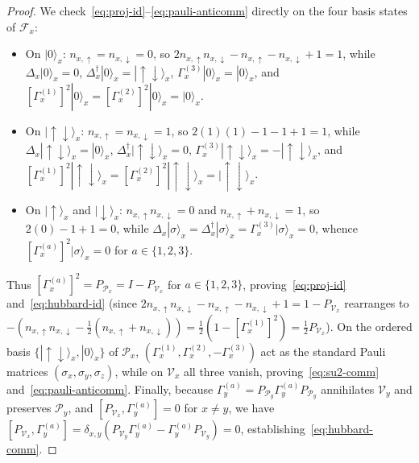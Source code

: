 \documentclass[11pt]{article}
\theoremstyle{definition}
\theoremstyle{remark}
\newcommand{\calF}{\mathcal{F}}
\newcommand{\calP}{\mathcal{P}}
\newcommand{\calV}{\mathcal{V}}
\begin{document}
\begin{proof}
We check~\eqref{eq:proj-id}--\eqref{eq:pauli-anticomm} directly on the four basis states of $\calF_x$:
\begin{itemize}[leftmargin=2em]
\item On $|0\rangle_x$: $n_{x,\uparrow} = n_{x,\downarrow} = 0$, so $2 n_{x,\uparrow}n_{x,\downarrow} - n_{x,\uparrow} - n_{x,\downarrow} + 1 = 1$, while $\Delta_x |0\rangle_x = 0$, $\Delta_x^\dagger |0\rangle_x = |\uparrow\downarrow\rangle_x$, $\Gamma_x^{(3)} |0\rangle_x = |0\rangle_x$, and $[\Gamma_x^{(1)}]^2 |0\rangle_x = [\Gamma_x^{(2)}]^2 |0\rangle_x = |0\rangle_x$.
\item On $|\uparrow\downarrow\rangle_x$: $n_{x,\uparrow} = n_{x,\downarrow} = 1$, so $2(1)(1) - 1 - 1 + 1 = 1$, while $\Delta_x |\uparrow\downarrow\rangle_x = |0\rangle_x$, $\Delta_x^\dagger |\uparrow\downarrow\rangle_x = 0$, $\Gamma_x^{(3)} |\uparrow\downarrow\rangle_x = -|\uparrow\downarrow\rangle_x$, and $[\Gamma_x^{(1)}]^2 |\uparrow\downarrow\rangle_x = [\Gamma_x^{(2)}]^2 |\uparrow\downarrow\rangle_x = |\uparrow\downarrow\rangle_x$.
\item On $|\uparrow\rangle_x$ and $|\downarrow\rangle_x$: $n_{x,\uparrow}n_{x,\downarrow} = 0$ and $n_{x,\uparrow} + n_{x,\downarrow} = 1$, so $2(0) - 1 + 1 = 0$, while $\Delta_x |\sigma\rangle_x = \Delta_x^\dagger |\sigma\rangle_x = \Gamma_x^{(3)} |\sigma\rangle_x = 0$, whence $[\Gamma_x^{(a)}]^2 |\sigma\rangle_x = 0$ for $a \in \{1,2,3\}$.
\end{itemize}
Thus $[\Gamma_x^{(a)}]^2 = P_{\calP_x} = I - P_{\calV_x}$ for $a \in \{1,2,3\}$, proving~\eqref{eq:proj-id} and~\eqref{eq:hubbard-id} (since $2n_{x,\uparrow}n_{x,\downarrow} - n_{x,\uparrow} - n_{x,\downarrow} + 1 = 1 - P_{\calV_x}$ rearranges to $-(n_{x,\uparrow}n_{x,\downarrow} - \frac{1}{2}(n_{x,\uparrow}+n_{x,\downarrow})) = \frac{1}{2}(1 - [\Gamma_x^{(1)}]^2) = \frac{1}{2}P_{\calV_x}$). On the ordered basis $\{|\uparrow\downarrow\rangle_x, |0\rangle_x\}$ of $\calP_x$, $(\Gamma_x^{(1)}, \Gamma_x^{(2)}, -\Gamma_x^{(3)})$ act as the standard Pauli matrices $(\sigma_x, \sigma_y, \sigma_z)$, while on $\calV_x$ all three vanish, proving~\eqref{eq:su2-comm} and~\eqref{eq:pauli-anticomm}. Finally, because $\Gamma_y^{(a)} = P_{\calP_y}\Gamma_y^{(a)}P_{\calP_y}$ annihilates $\calV_y$ and preserves $\calP_y$, and $[P_{\calV_x}, \Gamma_y^{(a)}] = 0$ for $x \ne y$, we have $[P_{\calV_x}, \Gamma_y^{(a)}] = \delta_{x,y}(P_{\calV_y}\Gamma_y^{(a)} - \Gamma_y^{(a)}P_{\calV_y}) = 0$, establishing~\eqref{eq:hubbard-comm}.
\end{proof}
\end{document}
